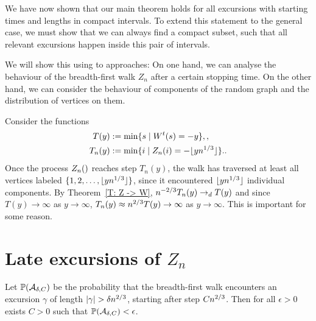 We have now shown that our main theorem holds for all excursions
with starting times and lengths in compact intervals.
To extend this statement to the general case,
we must show that we can always find a compact subset,
such that all relevant excursions happen inside this pair of intervals.

We will show this using to approaches:
On one hand, we can analyse the behaviour of the breadth-first walk $Z_n$
after a certain stopping time.
On the other hand, 
we can consider the behaviour of components of the random graph
and the distribution of vertices on them.

Consider the functions
\begin{align}
T(y) &:= \min \{s \;|\; W^t(s)=-y\}, \label{E: def T(y)}, \\
T_n(y) &:= \min\{i \;|\; Z_n(i)=-\lfloor yn^{1 / 3}\rfloor \}. \label{E: def Tn(y)}.
\end{align}
Once the process $\Zn$ reaches step $T_n(y)$, 
the walk has traversed at least all vertices labeled $\{1,2,\dots,\lfloor yn^{1 / 3}\rfloor\}$,
since it encountered $\lfloor yn^{1 / 3}\rfloor$ individual components.
By Theorem~\ref{T: Z -> W}, $n^{-2 / 3}T_n(y) \rightarrow_d T(y)$
and since $T(y) \rightarrow \infty$ as $y\rightarrow\infty$,
$T_n(y) \approx n^{2 / 3}T(y) \rightarrow\infty$ as $y\rightarrow \infty$.
This is important for some reason.


\section{Late excursions of $Z_n$}

\begin{lemma}
	Let 
	$\mathbb{P}(\mathcal{A}_{\delta, C})$ 
	be the probability that the breadth-first walk encounters an excursion $\gamma$ of length 
	$|\gamma| > \delta n^{2 / 3}$, starting after step $Cn^{2 / 3}$.
	Then for all $\epsilon>0$ exists $C>0$ such that $\mathbb{P}(\mathcal{A}_{\delta, C}) < \epsilon$. 
\end{lemma}

